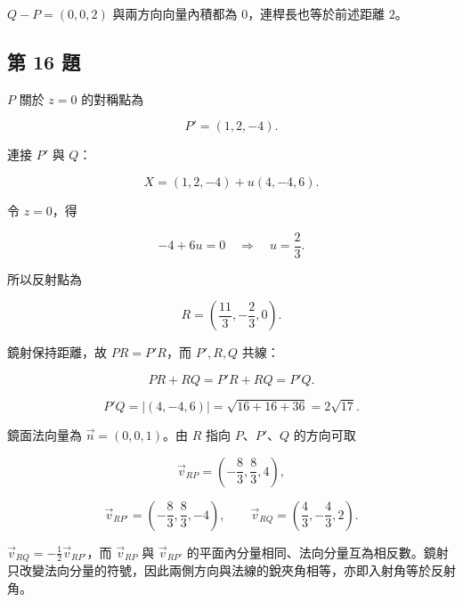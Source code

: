 \documentclass[11pt,a4paper]{article}
\begin{document}
\(Q-P=(0,0,2)\) 與兩方向向量內積都為 \(0\)，連桿長也等於前述距離 \(2\)。

\clearpage

\subsection{第 16 題}\label{ux7b2c-16-ux984c}

\(P\) 關於 \(z=0\) 的對稱點為

\[
\boxed{P'=(1,2,-4)}.
\]

連接 \(P'\) 與 \(Q\)：

\[
X=(1,2,-4)+u(4,-4,6).
\]

令 \(z=0\)，得

\[
-4+6u=0
\quad\Longrightarrow\quad
u=\frac23.
\]

所以反射點為

\[
\boxed{R=\left(\frac{11}{3},-\frac23,0\right)}.
\]

鏡射保持距離，故 \(PR=P'R\)，而 \(P',R,Q\) 共線：

\[
PR+RQ=P'R+RQ=P'Q.
\]

\[
P'Q
=|(4,-4,6)|
=\sqrt{16+16+36}
=\boxed{2\sqrt{17}}.
\]

鏡面法向量為 \(\vec n=(0,0,1)\)。由 \(R\) 指向 \(P\)、\(P'\)、\(Q\) 的方向可取

\[
\vec v_{RP}=\left(-\frac83,\frac83,4\right),
\]

\[
\vec v_{RP'}=\left(-\frac83,\frac83,-4\right),
\qquad
\vec v_{RQ}=\left(\frac43,-\frac43,2\right).
\]

\(\vec v_{RQ}=-\tfrac12\vec v_{RP'}\)，而 \(\vec v_{RP}\) 與 \(\vec v_{RP'}\) 的平面內分量相同、法向分量互為相反數。鏡射只改變法向分量的符號，因此兩側方向與法線的銳夾角相等，亦即入射角等於反射角。
\end{document}
